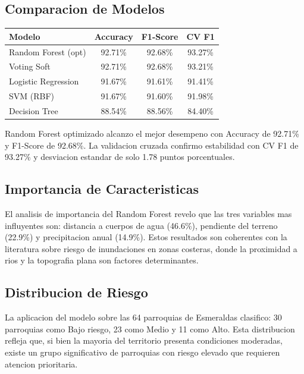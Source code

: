 \documentclass[12pt,a4paper]{article}
\begin{document}
\subsection{Comparacion de Modelos}

\begin{center}
\begin{tabular}{lccc}
\toprule
\textbf{Modelo} & \textbf{Accuracy} & \textbf{F1-Score} & \textbf{CV F1} \\
\midrule
Random Forest (opt) & 92.71\% & 92.68\% & 93.27\% \\
Voting Soft & 92.71\% & 92.68\% & 93.21\% \\
Logistic Regression & 91.67\% & 91.61\% & 91.41\% \\
SVM (RBF) & 91.67\% & 91.60\% & 91.98\% \\
Decision Tree & 88.54\% & 88.56\% & 84.40\% \\
\bottomrule
\end{tabular}
\end{center}

Random Forest optimizado alcanzo el mejor desempeno con Accuracy de 92.71\% y F1-Score de 92.68\%. La validacion cruzada confirmo estabilidad con CV F1 de 93.27\% y desviacion estandar de solo 1.78 puntos porcentuales.

\subsection{Importancia de Caracteristicas}

El analisis de importancia del Random Forest revelo que las tres variables mas influyentes son: distancia a cuerpos de agua (46.6\%), pendiente del terreno (22.9\%) y precipitacion anual (14.9\%). Estos resultados son coherentes con la literatura sobre riesgo de inundaciones en zonas costeras, donde la proximidad a rios y la topografia plana son factores determinantes.

\subsection{Distribucion de Riesgo}

La aplicacion del modelo sobre las 64 parroquias de Esmeraldas clasifico: 30 parroquias como Bajo riesgo, 23 como Medio y 11 como Alto. Esta distribucion refleja que, si bien la mayoria del territorio presenta condiciones moderadas, existe un grupo significativo de parroquias con riesgo elevado que requieren atencion prioritaria.
\end{document}
